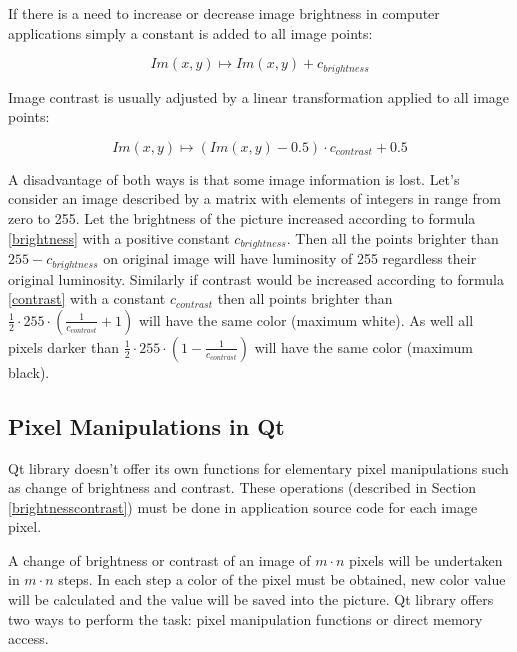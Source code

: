 If there is a need to increase or decrease image brightness in computer applications simply a constant is added to all image points:

\begin{equation}
\label{brightness}
  Im(x,y) \longmapsto Im(x,y) + c_{brightness} 
\end{equation}

Image contrast is usually adjusted by a linear transformation applied to all image points:

\begin{equation}
\label{contrast}
  Im(x,y) \longmapsto   (Im(x,y) - 0.5) \cdot c_{contrast} + 0.5
\end{equation}

A disadvantage of both ways is that some image information is lost. Let's consider an image described by a matrix with elements of integers in range from zero to 255. Let the brightness of the picture increased according to formula \eqref{brightness} with a positive constant $ c_{brightness} $. Then all the points brighter than $ 255 - c_{brightness} $ on original image will have luminosity of 255 regardless their original luminosity. Similarly if contrast would be increased according to formula \eqref{contrast} with a constant $ c_{contrast} $ then all points brighter than $ \frac{1}{2} \cdot 255 \cdot (\frac{1}{c_{contrast}}+1) $ will have the same color (maximum white). As well all pixels darker than $ \frac{1}{2} \cdot 255 \cdot (1 - \frac{1}{c_{contrast}}) $ will have the same color (maximum black).


\subsection{Pixel Manipulations in Qt}

Qt library doesn't offer its own functions for elementary pixel manipulations such as change of brightness and contrast. These operations (described in Section \ref{brightnesscontrast}) must be done in application source code for each image pixel.

A change of brightness or contrast of an image of $m \cdot n$ pixels will be undertaken in $m \cdot n$ steps. In each step a color of the pixel must be obtained, new color value will be calculated and the value will be saved into the picture. Qt library offers two ways to perform the task: pixel manipulation functions or direct memory access.

